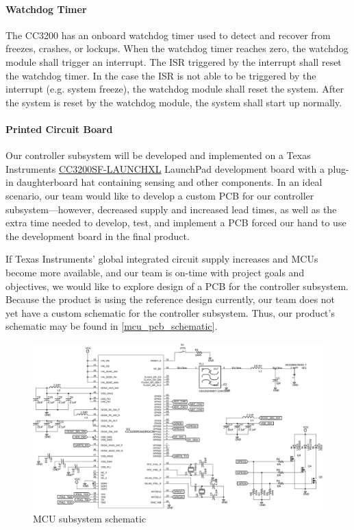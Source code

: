 \paragraph{Watchdog Timer} The CC3200 has an onboard watchdog timer used to detect and recover from freezes, crashes, or lockups. When the watchdog timer reaches zero, the watchdog module shall trigger an interrupt. The ISR triggered by the interrupt shall reset the watchdog timer. In the case the ISR is not able to be triggered by the interrupt (e.g. system freeze), the watchdog module shall reset the system. After the system is reset by the watchdog module, the system shall start up normally.

\paragraph{Printed Circuit Board} Our controller subsystem will be developed and implemented on a Texas Instruments \href{https://www.ti.com/tool/CC3200SF-LAUNCHXL}{CC3200SF-LAUNCHXL} LaunchPad development board with a plug-in daughterboard hat containing sensing and other components. In an ideal scenario, our team would like to develop a custom PCB for our controller subsystem---however, decreased supply and increased lead times, as well as the extra time needed to develop, test, and implement a PCB forced our hand to use the development board in the final product.

If Texas Instruments' global integrated circuit supply increases and MCUs become more available, and our team is on-time with project goals and objectives, we would like to explore design of a PCB for the controller subsystem. Because the product is using the reference design currently, our team does not yet have a custom schematic for the controller subsystem. Thus, our product's schematic  may be found in \autoref{mcu_pcb_schematic}.
\begin{figure}[H]
    \caption{MCU subsystem schematic}
    \label{mcu_pcb_schematic}
    \centering
    \includegraphics[width=\textwidth]{images/mcu_pcb_schematic.png}
\end{figure}